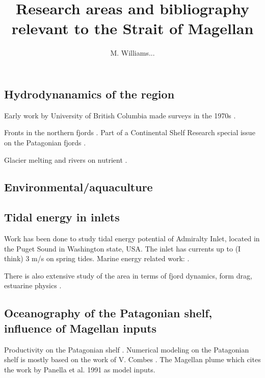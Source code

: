 \documentclass[11pt, oneside]{article}   	%
\title{Research areas and bibliography relevant to the Strait of Magellan}
\author{M. Williams...}
\begin{document}
\maketitle

\subsection{Hydrodynanamics of the region} 

Early work by University of British Columbia made surveys in the 1970s \cite{ppickard71}.

Fronts in the northern fjords \citep{calvete11}. Part of a Continental Shelf Research special issue on the Patagonian fjords \cite{pantoja11}.

Glacier melting and rivers on nutrient \citep{vargas18}.

\subsection{Environmental/aquaculture}

\citep{niklitschek13}

\subsection*{Tidal energy in inlets}

Work has been done to study tidal energy potential of Admiralty Inlet, located in the Puget Sound in Washington state, USA. The inlet has currents up to (I think) 3 m/s on spring tides. Marine energy related work: \citep{polagye13, kawasethyng10, thomson12, polagye09}. 

There is also extensive study of the area in terms of fjord dynamics, form drag, estuarine physics \citep[e.g.][]{warner13, geyer82}.


\subsection*{Oceanography of the Patagonian shelf, influence of Magellan inputs}
Productivity on the Patagonian shelf \citep{song16}. Numerical modeling on the Patagonian shelf is mostly based on the work of V. Combes \citep{combes14}. The Magellan plume \citep{palma12} which cites the work by Panella et al. 1991 as model inputs.
\end{document}
